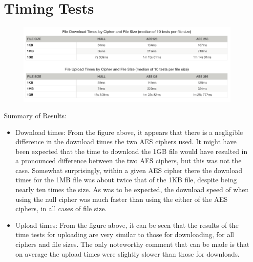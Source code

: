 \documentclass[11pt]{article}
\begin{document}
\section*{Timing Tests}

	\begin{figure}[H]
	\includegraphics[scale=0.5, trim={0cm 0cm 0cm 0cm}, clip]{time_tab}
	\caption{}
	\end{figure}

Summary of Results:\newline

\begin{itemize}
	\item Download times: From the figure above, it appears that there is a negligible difference in the download times the two AES ciphers used. It might have been expected that the time to download the 1GB file would have resulted in a pronounced difference between the two AES ciphers, but this was not the case. Somewhat surprisingly, within a given AES cipher there the download times for the 1MB file was about twice that of the 1KB file, despite being nearly ten times the size.  As was to be expected, the download speed of when using the null cipher was much faster than using the either of the AES ciphers, in all cases of file size. 
	\item Upload times: From the figure above, it can be seen that the results of the time tests for uploading are very similar to those for downloading, for all ciphers and file sizes. The only noteworthy comment that can be made is that on average the upload times were slightly slower than those for downloads.
\end{itemize}
\end{document}
